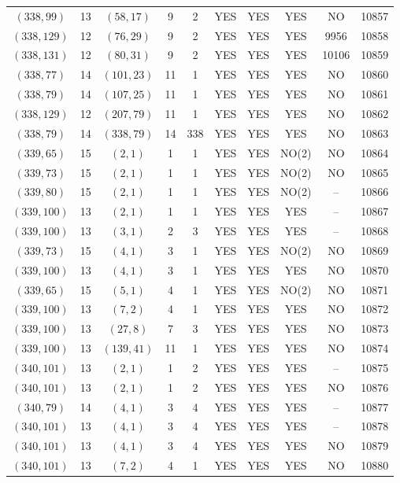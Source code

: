 \begin{longtable}{|c|c|c|c|c|c|c|c|c|c|}
$(338, 99)$ & 13 & $(58, 17)$ & 9 & 2 & YES & YES & YES & NO & 10857\\
$(338, 129)$ & 12 & $(76, 29)$ & 9 & 2 & YES & YES & YES & 9956 & 10858\\
$(338, 131)$ & 12 & $(80, 31)$ & 9 & 2 & YES & YES & YES & 10106 & 10859\\
$(338, 77)$ & 14 & $(101, 23)$ & 11 & 1 & YES & YES & YES & NO & 10860\\
$(338, 79)$ & 14 & $(107, 25)$ & 11 & 1 & YES & YES & YES & NO & 10861\\
$(338, 129)$ & 12 & $(207, 79)$ & 11 & 1 & YES & YES & YES & NO & 10862\\
$(338, 79)$ & 14 & $(338, 79)$ & 14 & 338 & YES & YES & YES & NO & 10863\\
$(339, 65)$ & 15 & $(2, 1)$ & 1 & 1 & YES & YES & NO(2) & NO & 10864\\
$(339, 73)$ & 15 & $(2, 1)$ & 1 & 1 & YES & YES & NO(2) & NO & 10865\\
$(339, 80)$ & 15 & $(2, 1)$ & 1 & 1 & YES & YES & NO(2) & -- & 10866\\
$(339, 100)$ & 13 & $(2, 1)$ & 1 & 1 & YES & YES & YES & -- & 10867\\
$(339, 100)$ & 13 & $(3, 1)$ & 2 & 3 & YES & YES & YES & -- & 10868\\
$(339, 73)$ & 15 & $(4, 1)$ & 3 & 1 & YES & YES & NO(2) & NO & 10869\\
$(339, 100)$ & 13 & $(4, 1)$ & 3 & 1 & YES & YES & YES & NO & 10870\\
$(339, 65)$ & 15 & $(5, 1)$ & 4 & 1 & YES & YES & NO(2) & NO & 10871\\
$(339, 100)$ & 13 & $(7, 2)$ & 4 & 1 & YES & YES & YES & NO & 10872\\
$(339, 100)$ & 13 & $(27, 8)$ & 7 & 3 & YES & YES & YES & NO & 10873\\
$(339, 100)$ & 13 & $(139, 41)$ & 11 & 1 & YES & YES & YES & NO & 10874\\
$(340, 101)$ & 13 & $(2, 1)$ & 1 & 2 & YES & YES & YES & -- & 10875\\
$(340, 101)$ & 13 & $(2, 1)$ & 1 & 2 & YES & YES & YES & NO & 10876\\
$(340, 79)$ & 14 & $(4, 1)$ & 3 & 4 & YES & YES & YES & -- & 10877\\
$(340, 101)$ & 13 & $(4, 1)$ & 3 & 4 & YES & YES & YES & -- & 10878\\
$(340, 101)$ & 13 & $(4, 1)$ & 3 & 4 & YES & YES & YES & NO & 10879\\
$(340, 101)$ & 13 & $(7, 2)$ & 4 & 1 & YES & YES & YES & NO & 10880\\

\end{longtable}
